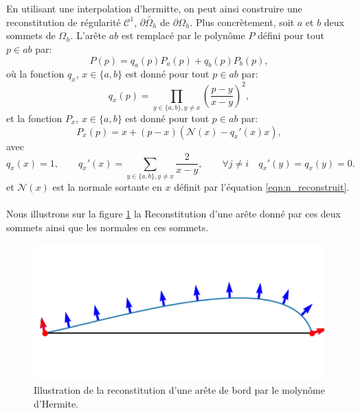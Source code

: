 En utilisant une interpolation d'hermitte, on peut ainsi construire une reconstitution de régularité $\mathcal{C}^1$, $\partial\widetilde{\Omega_h}$ de $\partial\Omega_h$. Plus concrètement, soit $a$ et $b$ deux sommets de $\Omega_h$. L'arête $ab$ est remplacé par le polynôme $P$ défini pour tout $p\in ab$ par:
\[P(p) = q_a(p)P_a(p)+q_b(p)P_b(p),\]
où la fonction $q_x$, $x\in\{a, b\}$ est donné pour tout $p\in ab$ par:
\[q_x(p) = \prod_{y\in\{a,b\}, y\neq x} \left(\frac{p - y}{x - y}\right)^2,\]
et la fonction $P_x$, $x\in\{a, b\}$ est donné pour tout $p\in ab$ par:
\[P_x(p) = x + (p - x) \left(\mathcal{N}(x) - q_x'(x)x\right),\]
avec
\[q_x(x)=1,\quad\quad
q_x'(x)=\sum_{y\in\{a,b\}, y\neq x}\frac{2}{x - y},\quad\quad
\forall j \neq i \quad q_x'(y) = q_x(y) = 0.
\]
et $\mathcal{N}(x)$ est la normale sortante en $x$ définit par l'équation \eqref{eqn:n_reconstruit}.\\\\
Nous illustrons sur la figure \ref{fig:hermite} la Reconstitution d'une arête donné par ces deux sommets ainsi que les normales en ces sommets.


\begin{figure}[!h]
\centering
\includegraphics[scale=0.55]{images/hermite.pdf}
\caption{Illustration de la reconstitution d'une arête de bord par le molynôme d'Hermite.}
\label{fig:hermite}
\end{figure}

